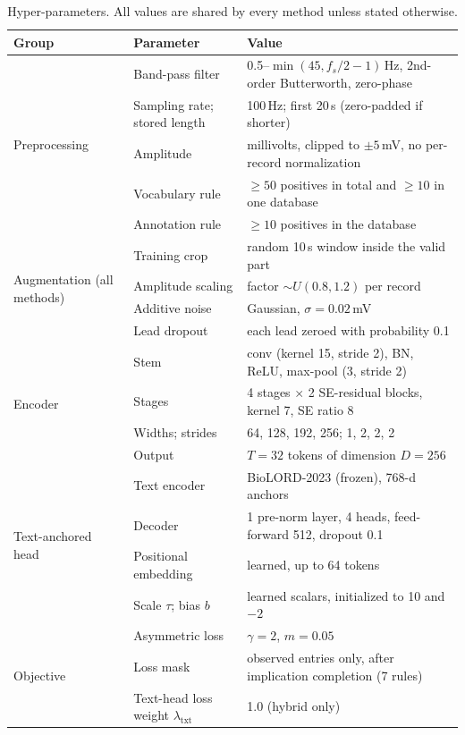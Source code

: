 \begin{table}[!htbp]
\centering\footnotesize
\caption{Hyper-parameters. All values are shared by every method unless stated otherwise.}\label{tab:hyper}
\begin{tabularx}{\textwidth}{@{}l l X@{}}
\toprule
Group & Parameter & Value \\
\midrule
\multirow{5}{*}{Preprocessing}
 & Band-pass filter & 0.5--$\min(45,f_s/2-1)$\,Hz, 2nd-order Butterworth, zero-phase \\
 & Sampling rate; stored length & 100\,Hz; first 20\,s (zero-padded if shorter) \\
 & Amplitude & millivolts, clipped to $\pm5$\,mV, no per-record normalization \\
 & Vocabulary rule & $\ge50$ positives in total and $\ge10$ in one database \\
 & Annotation rule & $\ge10$ positives in the database \\
\midrule
\multirow{4}{*}{Augmentation (all methods)}
 & Training crop & random 10\,s window inside the valid part \\
 & Amplitude scaling & factor $\sim U(0.8,1.2)$ per record \\
 & Additive noise & Gaussian, $\sigma=0.02$\,mV \\
 & Lead dropout & each lead zeroed with probability 0.1 \\
\midrule
\multirow{4}{*}{Encoder}
 & Stem & conv (kernel 15, stride 2), BN, ReLU, max-pool (3, stride 2) \\
 & Stages & 4 stages $\times$ 2 SE-residual blocks, kernel 7, SE ratio 8 \\
 & Widths; strides & 64, 128, 192, 256; 1, 2, 2, 2 \\
 & Output & $T=32$ tokens of dimension $D=256$ \\
\midrule
\multirow{4}{*}{Text-anchored head}
 & Text encoder & BioLORD-2023 (frozen), 768-d anchors \\
 & Decoder & 1 pre-norm layer, 4 heads, feed-forward 512, dropout 0.1 \\
 & Positional embedding & learned, up to 64 tokens \\
 & Scale $\tau$; bias $b$ & learned scalars, initialized to 10 and $-2$ \\
\midrule
\multirow{5}{*}{Objective}
 & Asymmetric loss & $\gamma=2$, $m=0.05$ \\
 & Loss mask & observed entries only, after implication completion (7 rules) \\
 & Text-head loss weight $\lambda_{\mathrm{txt}}$ & 1.0 (hybrid only) \\

\end{tabularx}
\end{table}
